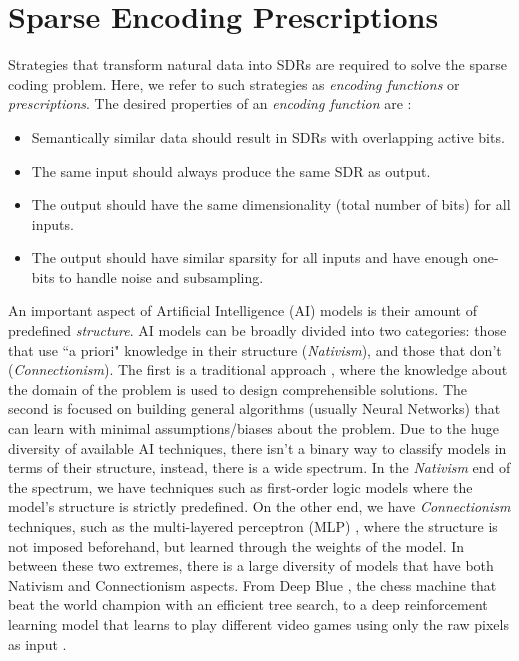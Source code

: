 \documentclass[runningheads]{llncs}
\begin{document}
\section{Sparse Encoding Prescriptions}
\label{sec:prescriptions}

Strategies that transform natural data into SDRs are required to solve the sparse
coding problem. Here, we refer to such strategies as \textit{encoding functions} or \textit{prescriptions}.
The desired properties of an \textit{encoding function} are \cite{Hawkins-et-al-2016-Book}:
\begin{itemize}
    \item Semantically similar data should result in SDRs with overlapping active bits.
    \item The same input should always produce the same SDR as output.
    \item The output should have the same dimensionality (total number of bits) for all inputs.
    \item The output should have similar sparsity for all inputs and have enough one-bits to handle noise and subsampling.
\end{itemize}

An important aspect of Artificial Intelligence (AI) models is their amount of predefined \textit{structure}. AI models can be broadly divided into two categories: those that use ``a priori" knowledge in their structure (\textit{Nativism}), and those that don't (\textit{Connectionism}).
The first is a traditional approach \cite{newell2007computer}, where the knowledge about the domain of the problem is used to design comprehensible solutions.
The second is focused on building general algorithms (usually Neural Networks) that can learn with minimal assumptions/biases about the problem.
Due to the huge diversity of available AI techniques, there isn't a binary way to classify models in terms of their structure, instead, there is a wide spectrum.
In the \textit{Nativism} end of the spectrum, we have techniques such as first-order logic models \cite{mitchell1997machine} where the model's structure is strictly predefined.
On the other end, we have \textit{Connectionism} techniques, such as the multi-layered perceptron (MLP) \cite{hornik1989multilayer}, where the structure is not imposed beforehand, but learned through the weights of the model.
In between these two extremes, there is a large diversity of models that have both Nativism and Connectionism aspects. From Deep Blue \cite{campbell2002deep}, the chess machine that beat the world champion with an efficient tree search, to a deep reinforcement learning model that learns to play different video games using only the raw pixels as input  \cite{mnih2015human}.
\end{document}
